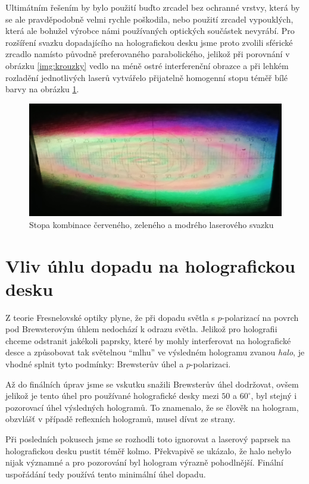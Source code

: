 \documentclass[twoside,project]{../MFFPrace}
\begin{document}
Ultimátním řešením by bylo použití buďto zrcadel bez ochranné vrstvy, která by se ale pravděpodobně velmi rychle poškodila, nebo použití zrcadel vypouklých, která ale bohužel výrobce námi používaných optických součástek nevyrábí. Pro rozšíření svazku dopadajícího na holografickou desku jsme proto zvolili sférické zrcadlo namísto původně preferovaného parabolického, jelikož při porovnání v obrázku \ref{img:krouzky} vedlo na méně ostré interferenční obrazce a při lehkém rozladění jednotlivých laserů vytvářelo přijatelně homogenní stopu téměř bílé barvy na obrázku \ref{img:bila}.

\begin{figure}
    \centering
    \includegraphics[width=0.7\linewidth]{../img/rgb-stopa.jpg}
    \caption{Stopa kombinace červeného, zeleného a modrého laserového svazku}
    \label{img:bila}
\end{figure}

\section{Vliv úhlu dopadu na holografickou desku}
Z teorie Fresnelovské optiky plyne, že při dopadu světla s $p$-polarizací na povrch pod Brewsterovým úhlem nedochází k odrazu světla. Jelikož pro holografii chceme odstranit jakékoli paprsky, které by mohly interferovat na holografické desce a způsobovat tak světelnou "`mlhu"' ve výsledném hologramu zvanou \textit{halo}, je vhodné splnit tyto podmínky: Brewsterův úhel a $p$-polarizaci.

Až do finálních úprav jsme se vskutku snažili Brewsterův úhel dodržovat, ovšem jelikož je tento úhel pro používané holografické desky mezi $50$ a $60^\circ$, byl stejný i pozorovací úhel výsledných hologramů. To znamenalo, že se člověk na hologram, obzvlášť v případě reflexních hologramů, musel dívat ze strany.

Při posledních pokusech jsme se rozhodli toto ignorovat a laserový paprsek na holografickou desku pustit téměř kolmo. Překvapivě se ukázalo, že halo nebylo nijak významné a pro pozorování byl hologram výrazně pohodlnější. Finální uspořádání tedy používá tento minimální úhel dopadu.
\end{document}

